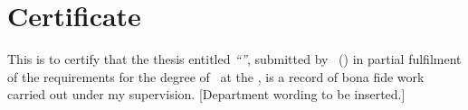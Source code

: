 \chapter*{Certificate}
This is to certify that the thesis entitled \emph{``\thesistitle''}, submitted by \authorname\ (\rollno) in partial fulfilment of the requirements for the degree of \degree\ at the \institute, is a record of bona fide work carried out under my supervision. [Department wording to be inserted.]

\vspace{2cm}
\noindent\supervisor\\ \supervisordesig\\ \department\\ \institute
\clearpage
